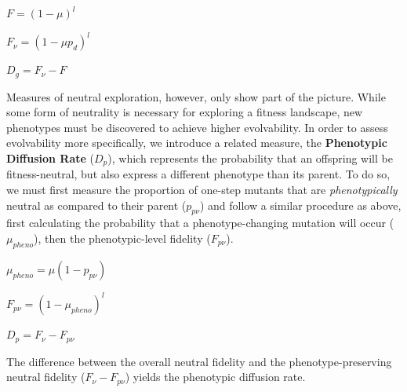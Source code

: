 \documentclass[letterpaper]{article}
\begin{document}
\begin{center}
$F = (1 - \mu)^l$

$F_\nu = (1 - \mu p_d)^l$

$D_g = F_\nu - F$
\end{center}

Measures of neutral exploration, however, only show part of the picture. While some form of neutrality is necessary for exploring a fitness landscape, new phenotypes must be discovered to achieve higher evolvability.
In order to assess evolvability more specifically, we introduce a related measure, the \textbf{Phenotypic Diffusion Rate} ($D_p$), which represents the probability that an offspring will be fitness-neutral, but also express a different phenotype than its parent. To do so, we must first measure the proportion of one-step mutants that are \textit{phenotypically} neutral as compared to their parent ($p_{p\nu}$) and follow a similar procedure as above, first calculating the probability that a phenotype-changing mutation will occur ($\mu_{pheno}$), then the phenotypic-level fidelity ($F_{p\nu}$).  
\begin{center}
$\mu_{pheno} = \mu (1- p_{p\nu})$

$F_{p\nu} = (1 - \mu_{pheno})^l$

$D_p = F_\nu - F_{p\nu}$
\end{center}
The difference between the overall neutral fidelity and the phenotype-preserving neutral fidelity ($F_\nu - F_{p\nu}$) yields the phenotypic diffusion rate.






% 
% 
\end{document}
